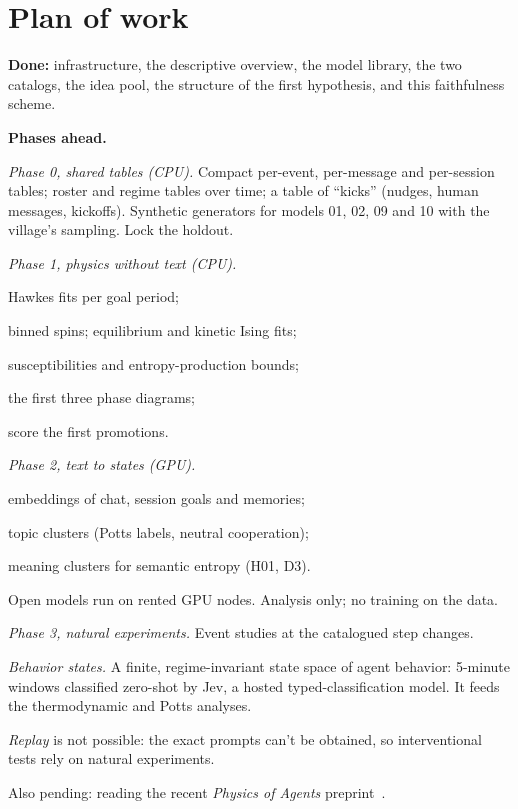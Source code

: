\documentclass[reprint,aps,pre,10pt,superscriptaddress,nofootinbib]{revtex4-2}
\newenvironment{tight}{\begin{list}{\textbullet}{\setlength{\itemsep}{0pt}\setlength{\parsep}{0pt}\setlength{\topsep}{2pt}\setlength{\partopsep}{0pt}\setlength{\leftmargin}{1.1em}\setlength{\labelwidth}{0.6em}\setlength{\labelsep}{0.4em}}}{\end{list}}
\begin{document}
\section{Plan of work}\label{sec:plan}

\textbf{Done:} infrastructure, the descriptive overview, the model library, the two catalogs, the idea pool, the structure of the first hypothesis, and this faithfulness scheme.

\textbf{Phases ahead.}
\begin{tight}
\item \emph{Phase 0, shared tables (CPU).} Compact per-event, per-message and per-session tables; roster and regime tables over time; a table of ``kicks'' (nudges, human messages, kickoffs). Synthetic generators for models 01, 02, 09 and 10 with the village's sampling. Lock the holdout.
\item \emph{Phase 1, physics without text (CPU).}
  \begin{tight}
  \item Hawkes fits per goal period;
  \item binned spins; equilibrium and kinetic Ising fits;
  \item susceptibilities and entropy-production bounds;
  \item the first three phase diagrams;
  \item score the first promotions.
  \end{tight}
\item \emph{Phase 2, text to states (GPU).}
  \begin{tight}
  \item embeddings of chat, session goals and memories;
  \item topic clusters (Potts labels, neutral cooperation);
  \item meaning clusters for semantic entropy (H01, D3).
  \end{tight}
  Open models run on rented GPU nodes. Analysis only; no training on the data.
\item \emph{Phase 3, natural experiments.} Event studies at the catalogued step changes.
\item \emph{Behavior states.} A finite, regime-invariant state space of agent behavior: 5-minute windows classified zero-shot by Jev, a hosted typed-classification model. It feeds the thermodynamic and Potts analyses.
\item \emph{Replay} is not possible: the exact prompts can't be obtained, so interventional tests rely on natural experiments.
\end{tight}
Also pending: reading the recent \emph{Physics of Agents} preprint~\cite{physicsofagents}.
\end{document}
